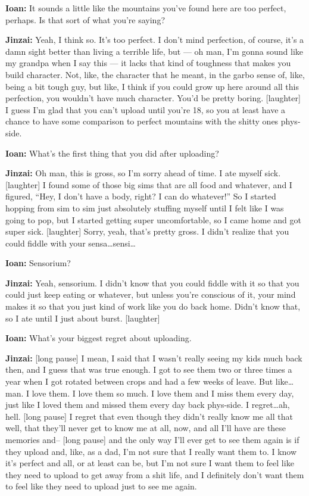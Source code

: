 \textbf{Ioan:} It sounds a little like the mountains you've found here are too perfect, perhaps. Is that sort of what you're saying?

\textbf{Jinzai:} Yeah, I think so. It's too perfect. I don't mind perfection, of course, it's a damn sight better than living a terrible life, but — oh man, I'm gonna sound like my grandpa when I say this — it lacks that kind of toughness that makes you build character. Not, like, the character that he meant, in the garbo sense of, like, being a bit tough guy, but like, I think if you could grow up here around all this perfection, you wouldn't have much character. You'd be pretty boring. {[}laughter{]} I guess I'm glad that you can't upload until you're 18, so you at least have a chance to have some comparison to perfect mountains with the shitty ones phys-side.

\textbf{Ioan:} What's the first thing that you did after uploading?

\textbf{Jinzai:} Oh man, this is gross, so I'm sorry ahead of time. I ate myself sick. {[}laughter{]} I found some of those big sims that are all food and whatever, and I figured, ``Hey, I don't have a body, right? I can do whatever!'' So I started hopping from sim to sim just absolutely stuffing myself until I felt like I was going to pop, but I started getting super uncomfortable, so I came home and got super sick. {[}laughter{]} Sorry, yeah, that's pretty gross. I didn't realize that you could fiddle with your sensa\ldots sensi\ldots{}

\textbf{Ioan:} Sensorium?

\textbf{Jinzai:} Yeah, sensorium. I didn't know that you could fiddle with it so that you could just keep eating or whatever, but unless you're conscious of it, your mind makes it so that you just kind of work like you do back home. Didn't know that, so I ate until I just about burst. {[}laughter{]}

\textbf{Ioan:} What's your biggest regret about uploading.

\textbf{Jinzai:} {[}long pause{]} I mean, I said that I wasn't really seeing my kids much back then, and I guess that was true enough. I got to see them two or three times a year when I got rotated between crops and had a few weeks of leave. But like\ldots man. I love them. I love them so much. I love them and I miss them every day, just like I loved them and missed them every day back phys-side. I regret\ldots ah, hell. {[}long pause{]} I regret that even though they didn't really know me all that well, that they'll never get to know me at all, now, and all I'll have are these memories and-- {[}long pause{]} and the only way I'll ever get to see them again is if they upload and, like, as a dad, I'm not sure that I really want them to. I know it's perfect and all, or at least can be, but I'm not sure I want them to feel like they need to upload to get away from a shit life, and I definitely don't want them to feel like they need to upload just to see me again.

